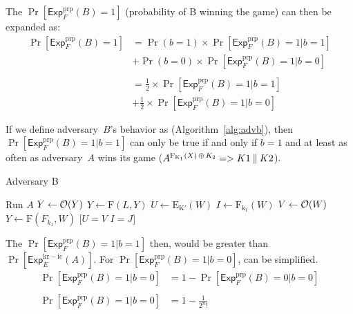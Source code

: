 \documentclass[11pt]{article}
\newcommand{\ExpPRP}[2]{\mathsf{Exp}^{\mathrm{prp}}_{#1}{(#2)}}
\newcommand{\ExpKR}[2]{\mathsf{Exp}^{\mathrm{kr-ic}}_{#1}{(#2)}}
\begin{document}

The $\Pr[\ExpPRP{F}{B} = 1]$ (probability of B winning the game) can then be expanded as:
\begin{equation}
  \begin{aligned}
  \Pr[\ExpPRP{F}{B} = 1] 
                        & = \Pr(b = 1) \times \Pr[\ExpPRP{F}{B} = 1 \vert b = 1]  \\
                        & + \Pr(b = 0) \times \Pr[\ExpPRP{F}{B} = 1 \vert b = 0] \\
                        \\
                        & = \frac{1}{2} \times \Pr[\ExpPRP{F}{B} = 1 \vert b = 1]  \\
                        & + \frac{1}{2} \times \Pr[\ExpPRP{F}{B} = 1 \vert b = 0] 
  \end{aligned}
\end{equation}




If we define adversary~$B$'s behavior as (Algorithm~\ref{alg:advb}),
then $\Pr[\ExpPRP{F}{B} = 1 \vert b = 1]$ can only be true if and only if $b = 1$ and at least as often as 
adversary~$A$ wins its game ($A^{\mathrm{F_{K_1}}(X) {\,\oplus\,} K_2} => K1 \:\|\: K2$).




\algrenewcommand{}
\begin{algorithm}{}
  \caption{Adversary B}\label{alg:advb}
\begin{algorithmic}[1]
  \State{} Run $A$
    \State{} $Y \gets {\cal O}(Y)$
  \EndIf{}
    \State{} $Y \gets \mathrm{F}(L,Y)$
  \EndIf{}
      \State{} $U \gets \mathrm{E_{K'}}(W)$
      \State{} $I \gets \mathrm{F_{k_1}}(W)$
      \State{} $V \gets {\cal O}(W)$
      \State{} $Y \gets \mathrm{F}(F_{k_1}, W)$
      \State{} \Return{} [$U = V$ \AND{} $I = J$]
    \EndFor{}
  \EndIf{}
  
\end{algorithmic}
\end{algorithm}




The $\Pr[\ExpPRP{F}{B} = 1 \vert b = 1]$ then, would be greater than $\Pr[\ExpKR{E}{A}]$.
For $\Pr[\ExpPRP{F}{B} = 1 \vert b = 0]$, can be simplified.
\begin{equation}
  \begin{aligned}
    \Pr[\ExpPRP{F}{B} = 1 \vert b = 0] 
                                    & = 1 - \Pr[\ExpPRP{F}{B} = 0 \vert b = 0] \\
                                    \\
    \Pr[\ExpPRP{F}{B} = 1 \vert b = 0] & = 1 - \frac{1}{2^{n}!}
  \end{aligned}
\end{equation}
\end{document}
